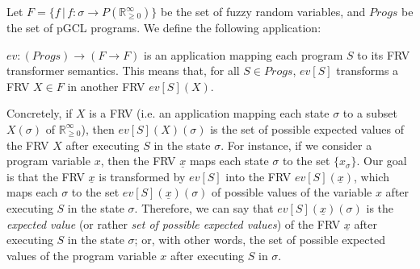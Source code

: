 \documentclass[a4paper,10pt]{llncs}
\def\RRposi {{\mathbb R_{\geq 0}^{\infty}}}
\begin{document}
Let $F = \{f \,|\, f : \sigma \rightarrow P(\RRposi) \}$ be the set of fuzzy random variables, and $Progs$ be the set of pGCL programs. We define the following application:

\begin{definition}
 $ev : (Progs) \rightarrow (F \rightarrow F)$ is an application mapping each program $S$ to its FRV transformer semantics. This means that, for all $S \in Progs$, $ev[S]$ transforms a FRV $X \in F$ in another FRV $ev[S](X)$.
\end{definition}
Concretely, if $X$ is a FRV (i.e. an application mapping each state $\sigma$ to a subset $X(\sigma)$ of $\RRposi$), then $ev[S](X)(\sigma)$ is the set of possible expected values of the FRV $X$ after executing $S$ in the state $\sigma$.\newline
For instance, if we consider a program variable $x$, then the FRV $\underline{x}$ maps each state $\sigma$ to the set $\{x_\sigma\}$. Our goal is that the FRV $\underline{x}$ is transformed by $ev[S]$ into the FRV $ev[S](\underline{x})$, which maps each $\sigma$ to the set $ev[S](\underline{x})(\sigma)$ of possible values of the variable $x$ after executing $S$ in the state $\sigma$. Therefore, we can say that $ev[S](\underline{x})(\sigma)$ is the \emph{expected value} (or rather \emph{set of possible expected values}) of the FRV $\underline{x}$ after executing $S$ in the state $\sigma$; or, with other words, the set of possible expected values of the program variable $x$ after executing $S$ in $\sigma$.\newline
\end{document}
